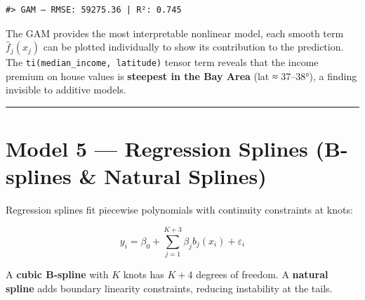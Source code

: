 \documentclass[
]{article}
\begin{document}
\begin{verbatim}
#> GAM — RMSE: 59275.36 | R²: 0.745
\end{verbatim}

The GAM provides the most interpretable nonlinear model, each smooth
term \(\hat{f}_j(x_j)\) can be plotted individually to show its
contribution to the prediction. The
\texttt{ti(median\_income,\ latitude)} tensor term reveals that the
income premium on house values is \textbf{steepest in the Bay Area} (lat
≈ 37--38°), a finding invisible to additive models.

\begin{center}\rule{0.5\linewidth}{0.5pt}\end{center}

\section{Model 5 --- Regression Splines (B-splines \& Natural
Splines)}\label{splines}

Regression splines fit piecewise polynomials with continuity constraints
at knots:

\[y_i = \beta_0 + \sum_{j=1}^{K+3} \beta_j b_j(x_i) + \varepsilon_i\]

A \textbf{cubic B-spline} with \(K\) knots has \(K + 4\) degrees of
freedom. A \textbf{natural spline} adds boundary linearity constraints,
reducing instability at the tails.
\end{document}
